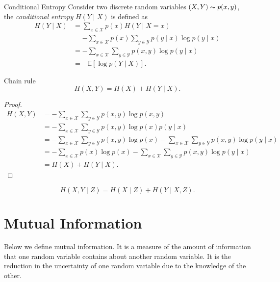 \begin{defn}{Conditional Entropy}{}
Consider two discrete random variables \((X,Y) \thicksim  p(x,y)\), the \textit{conditional entropy} \(H(Y \mid  X)\) is defined as 
\begin{align*}
    H(Y\mid X) &=  \sum_{x \in \mathcal{X} } p(x) H(Y\mid X = x)\\
    &= - \sum_{x \in \mathcal{X} } p(x) \sum_{y \in \mathcal{Y}  }p(y\mid x) \log p(y\mid x)\\
    &= - \sum_{x \in \mathcal{X} }\sum_{y \in \mathcal{Y} }  p(x,y) \log  p(y\mid x)\\
    &= - \mathbb{E} \left[ \log p(Y\mid X) \right]. 
\end{align*}

\end{defn}

\begin{thrm}{Chain rule}{}
\[
  H(X,Y) = H(X) + H(Y\mid X).
\]
\tcbline 
\begin{proof}
\begin{align*}
    H(X,Y) &=  - \sum_{x\in \mathcal{X} }\sum_{y \in \mathcal{Y} } p(x,y) \log p(x,y)\\
       &=  - \sum_{x\in \mathcal{X} }\sum_{y \in \mathcal{Y} } p(x,y) \log p(x)p(y\mid x)\\
       &=  - \sum_{x\in \mathcal{X} }\sum_{y \in \mathcal{Y} } p(x,y) \log p(x)- \sum_{x\in \mathcal{X} }\sum_{y \in \mathcal{Y} } p(x,y) \log p(y\mid x)\\
       &=  - \sum_{x\in \mathcal{X} } p(x) \log p(x)- \sum_{x\in \mathcal{X} }\sum_{y \in \mathcal{Y} } p(x,y) \log p(y\mid x)\\
       &= H(X) + H(Y\mid X).
\end{align*}

\end{proof}

\end{thrm}

\begin{cor}{}{}
\[
  H(X,Y\mid Z) = H(X\mid Z) + H(Y\mid X,Z).
\]
\end{cor}

\section{Mutual Information}


Below we define mutual information. It is a measure of the amount of information that one random variable contains about another random variable. It is the reduction in the uncertainty of one random variable due to the knowledge of the other. 

